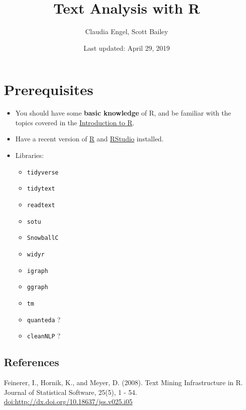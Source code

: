\documentclass[]{book}
\title{Text Analysis with R}
\author{Claudia Engel, Scott Bailey}
\date{Last updated: April 29, 2019}
\providecommand{\tightlist}{%
  \setlength{\itemsep}{0pt}\setlength{\parskip}{0pt}}
\begin{document}
\maketitle

{
\setcounter{tocdepth}{1}
\tableofcontents
}
\hypertarget{prerequisites}{%
\chapter*{Prerequisites}\label{prerequisites}}

\begin{itemize}
\item
  You should have some \textbf{basic knowledge} of R, and be familiar with the topics covered in the \href{https://cengel.github.io/R-intro/}{Introduction to R}.
\item
  Have a recent version of \href{https://cran.r-project.org/}{R} and \href{https://www.rstudio.com/}{RStudio} installed.
\item
  Libraries:

  \begin{itemize}
  \tightlist
  \item
    \texttt{tidyverse}
  \item
    \texttt{tidytext}
  \item
    \texttt{readtext}
  \item
    \texttt{sotu}
  \item
    \texttt{SnowballC}
  \item
    \texttt{widyr}
  \item
    \texttt{igraph}
  \item
    \texttt{ggraph}
  \item
    \texttt{tm}
  \item
    \texttt{quanteda} ?
  \item
    \texttt{cleanNLP} ?
  \end{itemize}
\end{itemize}

\hypertarget{references}{%
\section*{References}\label{references}}

Feinerer, I., Hornik, K., and Meyer, D. (2008). Text Mining Infrastructure in R. Journal of Statistical Software, 25(5), 1 - 54. \url{doi:http://dx.doi.org/10.18637/jss.v025.i05}
\end{document}
